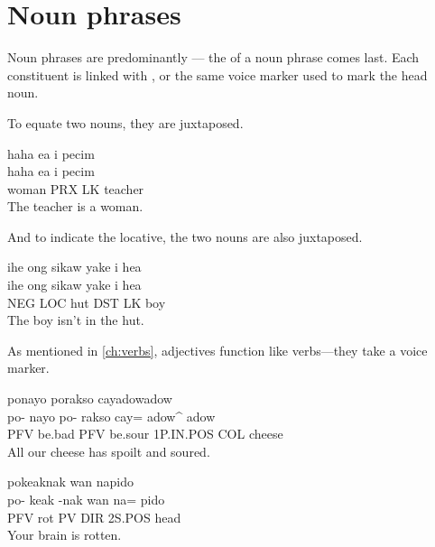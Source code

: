 \section{Noun phrases}
Noun phrases are predominantly  --- the 
of a noun phrase comes last. Each constituent is linked with \LK, or the same voice
marker used to mark the head noun.

To equate two nouns, they are juxtaposed.
\begin{example}
	\label{ex:woman_teacher}
	\script haha ea i pecim \\
	\bits haha ea i pecim \\
	\gloss woman PRX LK teacher \\
	\tr The teacher is a woman.
\end{example}
And to indicate the locative, the two nouns are also juxtaposed.
\begin{example}
	\label{ex:not_at_home}
	\script ihe ong sikaw yake i hea \\
	\bits ihe ong sikaw yake i hea \\
	\gloss NEG LOC hut DST LK boy \\
	\tr The boy isn't in the hut.
\end{example}
As mentioned in \cref{ch:verbs}, adjectives function like verbs---they take a voice
marker.
\begin{examples}
	\ex
	\label{ex:spoilt_cheese}
	\script ponayo porakso cayadowadow \\
	\bits po- nayo po- rakso cay= adow^ adow \\
	\gloss PFV be.bad PFV be.sour 1P.IN.POS COL cheese \\
	\tr All our cheese has spoilt and soured.

	\ex
	\label{ex:brain_rot}
	\script pokeaknak wan napido \\
	\bits po- keak -nak wan na= pido \\
	\gloss PFV rot PV DIR 2S.POS head \\
	\tr Your brain is rotten.
\end{examples}

